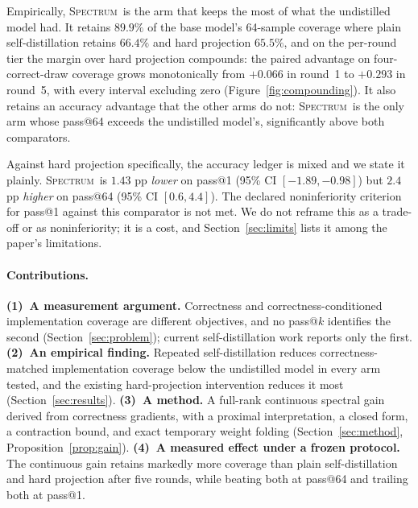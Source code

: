 \documentclass{article}
\newcommand{\method}{\textsc{Spectrum}}
\begin{document}
Empirically, \method\ is the arm that keeps the most of what the undistilled model had. It retains $89.9\%$ of the base model's 64-sample coverage where plain self-distillation retains $66.4\%$ and hard projection $65.5\%$, and on the per-round tier the margin over hard projection compounds: the paired advantage on four-correct-draw coverage grows monotonically from $+0.066$ in round~1 to $+0.293$ in round~5, with every interval excluding zero (Figure~\ref{fig:compounding}). It also retains an accuracy advantage that the other arms do not: \method\ is the only arm whose pass@64 exceeds the undistilled model's, significantly above both comparators.

Against hard projection specifically, the accuracy ledger is mixed and we state it plainly. \method\ is $1.43$ pp \emph{lower} on pass@1 (95\% CI $[-1.89,-0.98]$) but $2.4$ pp \emph{higher} on pass@64 (95\% CI $[0.6,4.4]$). The declared noninferiority criterion for pass@1 against this comparator is not met. We do not reframe this as a trade-off or as noninferiority; it is a cost, and Section~\ref{sec:limits} lists it among the paper's limitations.

\paragraph{Contributions.} \textbf{(1)~A measurement argument.} Correctness and correctness-conditioned implementation coverage are different objectives, and no pass@$k$ identifies the second (Section~\ref{sec:problem}); current self-distillation work reports only the first. \textbf{(2)~An empirical finding.} Repeated self-distillation reduces correctness-matched implementation coverage below the undistilled model in every arm tested, and the existing hard-projection intervention reduces it most (Section~\ref{sec:results}). \textbf{(3)~A method.} A full-rank continuous spectral gain derived from correctness gradients, with a proximal interpretation, a closed form, a contraction bound, and exact temporary weight folding (Section~\ref{sec:method}, Proposition~\ref{prop:gain}). \textbf{(4)~A measured effect under a frozen protocol.} The continuous gain retains markedly more coverage than plain self-distillation and hard projection after five rounds, while beating both at pass@64 and trailing both at pass@1.
\end{document}
